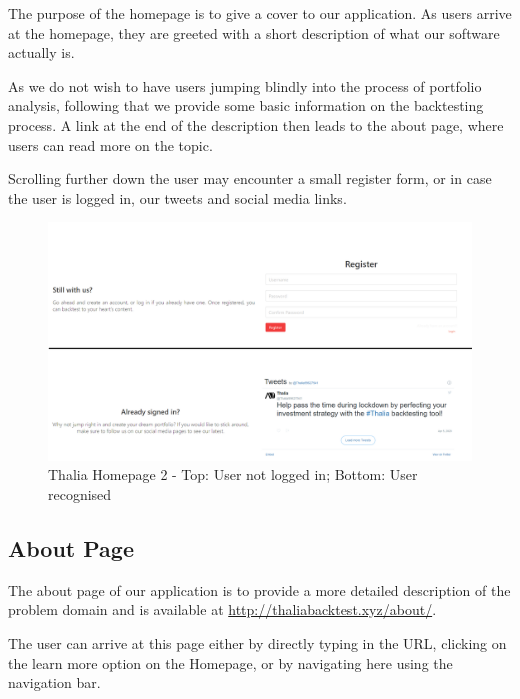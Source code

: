 \documentclass[main.tex]{subfiles}
\begin{document}
The purpose of the homepage is to give a cover to our application. As users arrive at the homepage, they are greeted with a short description of what our software actually is.

As we do not wish to have users jumping blindly into the process of portfolio analysis, following that we provide some basic information on the backtesting process. A link at the end of the description then leads to the about page, where users can read more on the topic.



Scrolling further down the user may encounter a small register form, or in case the user is logged in, our tweets and social media links.



\begin{figure}[H]

   \centering

   \includegraphics[width=\textwidth]{08Appendices/081User/081Pictures/homepage_bottom.png}

   \caption{Thalia Homepage 2 - Top: User not logged in; Bottom: User recognised}

   \label{thalia_home_bottom}

\end{figure}



\subsection{About Page}



The about page of our application is to provide a more detailed description of the problem domain and is available at \url{http://thaliabacktest.xyz/about/}.

The user can arrive at this page either by directly typing in the URL, clicking on the learn more option on the Homepage, or by navigating here using the navigation bar.
\end{document}
